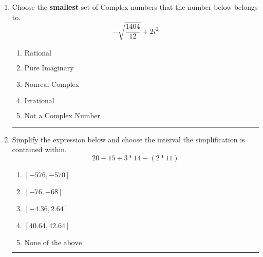 \documentclass[14pt]{extbook}
\newcommand{\litem}[1]{\item#1\hspace*{-1cm}\rule{\textwidth}{0.4pt}}
\begin{document}
\begin{enumerate}
{\begin{enumerate}[label=\Alph*.]
\end{enumerate} }
\litem{
Choose the \textbf{smallest} set of Complex numbers that the number below belongs to.\[ -\sqrt{\frac{1404}{12}}+2i^2 \]\begin{enumerate}[label=\Alph*.]
\item \( \text{Rational} \)
\item \( \text{Pure Imaginary} \)
\item \( \text{Nonreal Complex} \)
\item \( \text{Irrational} \)
\item \( \text{Not a Complex Number} \)

\end{enumerate} }
\litem{
Simplify the expression below and choose the interval the simplification is contained within.\[ 20 - 15 \div 3 * 14 - (2 * 11) \]\begin{enumerate}[label=\Alph*.]
\item \( [-576, -570] \)
\item \( [-76, -68] \)
\item \( [-4.36, 2.64] \)
\item \( [40.64, 42.64] \)
\item \( \text{None of the above} \)

\end{enumerate} }
\end{enumerate}
\end{document}
